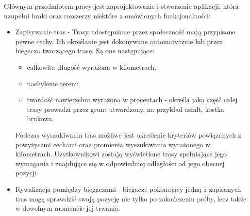 Głównym przedmiotem pracy jest zaprojektowanie i stworzenie aplikacji, która uzupełni braki oraz rozszerzy niektóre z omówionych funkcjonalności:
\begin{itemize}
\item Zapisywanie tras - Trasy udostępniane przez społeczność mają przypisane pewne cechy. Ich określanie jest dokonywane automatycznie lub przez biegacza tworzącego trasę. Są one następujące:
\begin{itemize}
\item całkowita długość wyrażona w kilometrach,
\item nachylenie terenu,
\item twardość nawierzchni wyrażona w procentach - określa jaka część całej trasy prowadzi przez grunt utwardzony, na przykład asfalt, kostka brukowa.
\end{itemize}
Podczas wyszukiwania tras możliwe jest określenie kryteriów powiązanych z powyżyszmi cechami oraz promienia wyszukiwania wyrażonego w kilometrach. Użytkownikowi zostają wyświetlone trasy spełniające jego wymagania i znajdujące się w odpowiedniej odległości od jego obecnej pozycji.
\item Rywalizacja pomiędzy biegaczami - biegacze pokonujący jedną z zapisanych tras mogą sprawdzić swoją pozycję nie tylko po zakończeniu próby, lecz także w dowolnym momencie jej trwania.
\end{itemize}